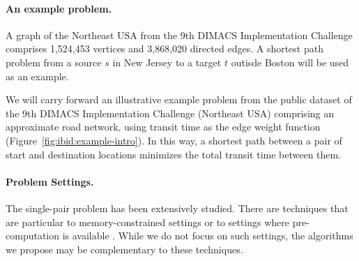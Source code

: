 \paragraph{An example problem.}
\begin{marginfigure}%
   \centering%
   \caption{A graph of the Northeast USA from the 9th DIMACS
      Implementation Challenge
      comprises 1,524,453 vertices and 3,868,020 directed edges.
      A shortest path problem from a source $s$ in New Jersey
      to a target $t$ outisde Boston
      will be used as an example.}%
   \label{fig:ibid:example-intro}%
\end{marginfigure}
We will carry forward an illustrative example problem from
the public dataset of the 9th DIMACS Implementation Challenge
\citep{demetrescuetal2006dimacs9}
(Northeast USA)
comprising an approximate road network,
using transit time as the edge weight function
(Figure~\ref{fig:ibid:example-intro}).
In this way,
a shortest path between a pair of start and destination locations
minimizes the total transit time between them.

\paragraph{Problem Settings.}
The single-pair problem has been extensively studied.
There are techniques that are particular to memory-constrained
settings \citep{kaindl1997biheurreconsidered}
or to settings where pre-computation is available
\citep{goldberg2007pointtopoint}.
While we do not focus on such settings,
the algorithms we propose may be complementary to these techniques.

